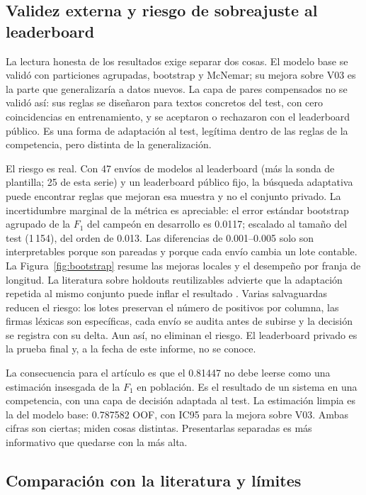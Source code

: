 \subsection{Validez externa y riesgo de sobreajuste al leaderboard}

La lectura honesta de los resultados exige separar dos cosas. El modelo base
se validó con particiones agrupadas, bootstrap y McNemar; su mejora sobre V03
es la parte que generalizaría a datos nuevos. La capa de pares compensados no
se validó así: sus reglas se diseñaron para textos concretos del test, con
cero coincidencias en entrenamiento, y se aceptaron o rechazaron con el
leaderboard público. Es una forma de adaptación al test, legítima dentro de
las reglas de la competencia, pero distinta de la generalización.

El riesgo es real. Con 47 envíos de modelos al leaderboard (más la sonda de
plantilla; 25 de esta serie) y un
leaderboard público fijo, la búsqueda adaptativa puede encontrar reglas que
mejoran esa muestra y no el conjunto privado. La incertidumbre marginal de la
métrica es apreciable: el error estándar bootstrap agrupado de la $F_1$ del
campeón en desarrollo es 0.0117; escalado al tamaño del test (1\,154), del
orden de 0.013. Las diferencias de 0.001--0.005 solo son interpretables porque
son pareadas y porque cada envío cambia un lote contable. La Figura~\ref{fig:bootstrap} resume las mejoras
locales y el desempeño por franja de longitud. La literatura sobre
holdouts reutilizables advierte que la adaptación repetida al mismo conjunto
puede inflar el resultado \cite{dwork2015reusable}. Varias salvaguardas
reducen el riesgo: los lotes preservan el número de positivos por columna, las
firmas léxicas son específicas, cada envío se audita antes de subirse y la
decisión se registra con su delta. Aun así, no eliminan el riesgo. El
leaderboard privado es la prueba final y, a la fecha de este informe, no se
conoce.

La consecuencia para el artículo es que el 0.81447 no debe leerse como una
estimación insesgada de la $F_1$ en población. Es el resultado de un sistema
en una competencia, con una capa de decisión adaptada al test. La estimación
limpia es la del modelo base: 0.787582 OOF, con IC95 para la mejora sobre
V03. Ambas cifras son ciertas; miden cosas distintas. Presentarlas separadas
es más informativo que quedarse con la más alta.

\subsection{Comparación con la literatura y límites}


